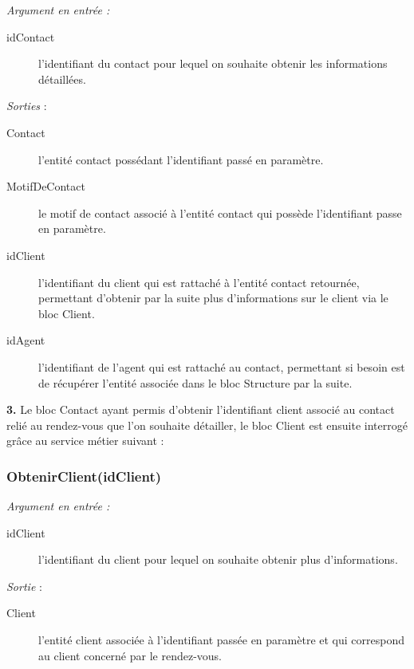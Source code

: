 \noindent \textit{Argument en entrée :}
\begin{description}
\item[idContact] l'identifiant du contact pour lequel on souhaite obtenir les informations détaillées. \\
\end{description}

\noindent \textit{Sorties} :
\begin{description}
\item[Contact] l'entité contact possédant l'identifiant passé en paramètre. 
\item[MotifDeContact] le motif de contact associé à l'entité contact qui possède l'identifiant passe en paramètre.  
\item[idClient] l'identifiant du client qui est rattaché à l'entité contact retournée, permettant d'obtenir par la suite plus d'informations sur le client via le bloc Client. 
\item[idAgent] l'identifiant de l'agent qui est rattaché au contact, permettant si besoin est de récupérer l'entité associée dans le bloc Structure par la suite. \\
\end{description}

\begin{shaded}
\textbf{3.} Le bloc Contact ayant permis d'obtenir l'identifiant client associé au contact relié au rendez-vous que l'on souhaite détailler, le bloc Client est ensuite interrogé grâce au service métier suivant :
\end{shaded}

\subsubsection{ObtenirClient(idClient)}

\noindent \textit{Argument en entrée :}
\begin{description}
\item[idClient] l'identifiant du client pour lequel on souhaite obtenir plus d'informations. \\
\end{description}


\noindent \textit{Sortie} :
\begin{description}
\item[Client] l'entité client associée à l'identifiant passée en paramètre et qui correspond au client concerné par le rendez-vous.\\
\end{description}

